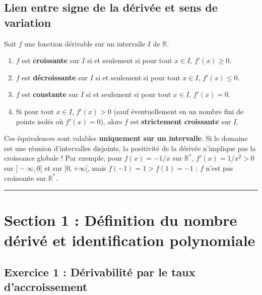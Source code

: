 \documentclass[11pt,a4paper]{article}
\newcommand{\R}{\mathbb{R}}
\begin{document}
\subsection{Lien entre signe de la dérivée et sens de variation}

\begin{theoremebox}
Soit $f$ une fonction dérivable sur un intervalle $I$ de $\R$.
\begin{enumerate}[label=\textbf{\arabic*.}]
    \item $f$ est \textbf{croissante} sur $I$ si et seulement si pour tout $x \in I$, $f'(x) \ge 0$.
    \item $f$ est \textbf{décroissante} sur $I$ si et seulement si pour tout $x \in I$, $f'(x) \le 0$.
    \item $f$ est \textbf{constante} sur $I$ si et seulement si pour tout $x \in I$, $f'(x) = 0$.
    \item Si pour tout $x \in I$, $f'(x) > 0$ (sauf éventuellement en un nombre fini de points isolés où $f'(x) = 0$), alors $f$ est \textbf{strictement croissante} sur $I$.
\end{enumerate}
\end{theoremebox}

\begin{warningbox}
Ces équivalences sont valables \textbf{uniquement sur un intervalle}. Si le domaine est une réunion d'intervalles disjoints, la positivité de la dérivée n'implique pas la croissance globale ! Par exemple, pour $f(x) = -1/x$ sur $\R^*$, $f'(x) = 1/x^2 > 0$ sur $]-\infty, 0[$ et sur $]0, +\infty[$, mais $f(-1) = 1 > f(1) = -1$ : $f$ n'est pas croissante sur $\R^*$.
\end{warningbox}


\vspace{1cm}
\hrule
\vspace{1cm}
\section{Section 1 : Définition du nombre dérivé et identification polynomiale}

\subsection*{Exercice 1 : Dérivabilité par le taux d'accroissement}
\end{document}
